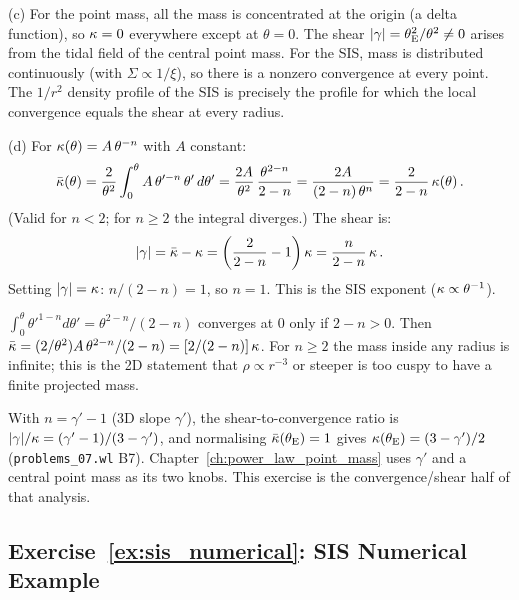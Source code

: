 (c) For the point mass, all the mass is concentrated at the
origin (a delta function), so $\kappa = 0$ everywhere except at
$\theta = 0$.  The shear $|\gamma| = \theta_{\mathrm{E}}^2/\theta^2 \neq 0$
arises from the tidal field of the central point mass.  For the SIS,
mass is distributed continuously (with $\Sigma \propto 1/\xi$), so
there is a nonzero convergence at every point.  The $1/r^2$ density
profile of the SIS is precisely the profile for which the local
convergence equals the shear at every radius.

(d) For $\kappa(\theta) = A\,\theta^{-n}$ with $A$ constant:
\begin{equation*}
    \bar{\kappa}(\theta) = \frac{2}{\theta^2}
    \int_0^\theta A\,\theta'^{-n}\, \theta'\, d\theta'
    = \frac{2A}{\theta^2}\, \frac{\theta^{2-n}}{2-n}
    = \frac{2A}{(2-n)\,\theta^n}
    = \frac{2}{2-n}\, \kappa(\theta) \,.
\end{equation*}
(Valid for $n < 2$; for $n \geq 2$ the integral diverges.)
The shear is:
\begin{equation*}
    |\gamma| = \bar{\kappa} - \kappa
    = \left(\frac{2}{2-n} - 1\right) \kappa
    = \frac{n}{2-n}\, \kappa \,.
\end{equation*}
Setting $|\gamma| = \kappa$: $n/(2-n) = 1$, so $n = 1$.
This is the SIS exponent ($\kappa \propto \theta^{-1}$).
\checkmark

\begin{derivation}
$\int_0^\theta\theta'^{1-n}d\theta' = \theta^{2-n}/(2-n)$ converges at $0$
only if $2-n>0$.  Then $\bar\kappa = (2/\theta^2)A\,\theta^{2-n}/(2-n)
= [2/(2-n)]\,\kappa$.  For $n\geq2$ the mass inside any radius is infinite;
this is the 2D statement that $\rho\propto r^{-3}$ or steeper is too
cuspy to have a finite projected mass.
\end{derivation}

\begin{bridge}
With $n = \gamma'-1$ (3D slope $\gamma'$), the shear-to-convergence ratio is
$|\gamma|/\kappa = (\gamma'-1)/(3-\gamma')$, and normalising
$\bar\kappa(\theta_{\mathrm{E}}) = 1$ gives $\kappa(\theta_{\mathrm{E}}) = (3-\gamma')/2$
(\texttt{problems\_07.wl} B7).  Chapter~\ref{ch:power_law_point_mass} uses
$\gamma'$ and a central point mass as its two knobs.  This exercise is the
convergence/shear half of that analysis.
\end{bridge}


\subsection*{Exercise~\ref{ex:sis_numerical}: SIS Numerical Example}

